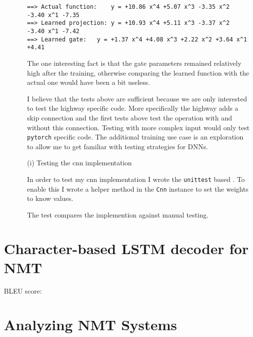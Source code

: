 \documentclass{article}
\begin{document}
\begin{enumerate}
\begin{itemize}
\begin{verbatim}
==> Actual function:	y = +10.86 x^4 +5.07 x^3 -3.35 x^2 -3.40 x^1 -7.35
==> Learned projection:	y = +10.93 x^4 +5.11 x^3 -3.37 x^2 -3.40 x^1 -7.42
==> Learned gate:	y = +1.37 x^4 +4.08 x^3 +2.22 x^2 +3.64 x^1 +4.41
\end{verbatim}

The one interesting fact is that the gate parameters remained relatively high after the training, otherwise comparing the learned function with the actual one would have been a bit useless.

I believe that the tests above are sufficient because we are only interested to test the highway specific code. More specifically the highway adds a skip connection and the first tests above test the operation with and without this connection. Testing with more complex input would only test \texttt{pytorch} specific code. The additional training use case is an exploration to allow me to get familiar with testing strategies for DNNs.

\clearpage

\item[(i)]{Testing the cnn implementation}

In order to test my cnn implementation I wrote the \texttt{unittest} based . To enable this I wrote a helper method in the \texttt{Cnn} instance to set the weights to know values.

The test compares the implemention against manual testing.

\end{itemize}


\end{enumerate}

\clearpage


\section{Character-based LSTM decoder for NMT}

BLEU score:

\clearpage
\section{Analyzing NMT Systems}
\end{document}
